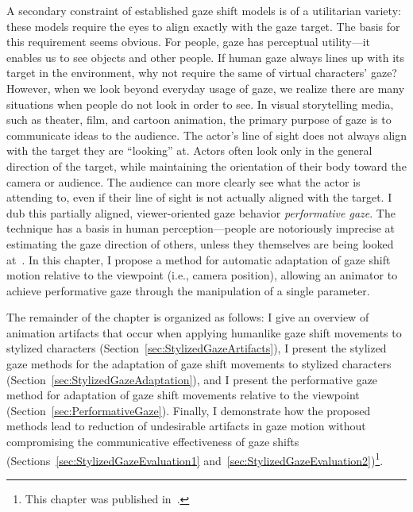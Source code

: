 A secondary constraint of established gaze shift models is of a utilitarian variety: these models require the eyes to align exactly with the gaze target. The basis for this requirement seems obvious. For people, gaze has perceptual utility---it enables us to see objects and other people. If human gaze always lines up with its target in the environment, why not require the same of virtual characters' gaze?
However, when we look beyond everyday usage of gaze, we realize there are many situations when people do not look in order to see.
In visual storytelling media, such as theater, film, and cartoon animation, the primary purpose of gaze is to communicate ideas to the audience. The actor's line of sight does not always align with the target they are ``looking'' at. Actors often look only in the general direction of the target, while maintaining the orientation of their body toward the camera or audience. The audience can more clearly see what the actor is attending to, even if their line of sight is not actually aligned with the target.
I dub this partially aligned, viewer-oriented gaze behavior \emph{performative gaze}. The technique has a basis in human perception---people are notoriously imprecise at estimating the gaze direction of others, unless they themselves are being looked at~\citep{argyle1976gaze}. In this chapter, I propose a method for automatic adaptation of gaze shift motion relative to the viewpoint (i.e., camera position), allowing an animator to achieve performative gaze through the manipulation of a single parameter.

The remainder of the chapter is organized as follows: I give an overview of animation artifacts that occur when applying humanlike gaze shift movements to stylized characters (Section~\ref{sec:StylizedGazeArtifacts}), I present the stylized gaze methods for the adaptation of gaze shift movements to stylized characters (Section~\ref{sec:StylizedGazeAdaptation}), and I present the performative gaze method for adaptation of gaze shift movements relative to the viewpoint (Section~\ref{sec:PerformativeGaze}). Finally, I demonstrate how the proposed methods lead to reduction of undesirable artifacts in gaze motion without compromising the communicative effectiveness of gaze shifts (Sections~\ref{sec:StylizedGazeEvaluation1} and~\ref{sec:StylizedGazeEvaluation2})\footnote{This chapter was published in~\citet{pejsa2013stylized}.}. 